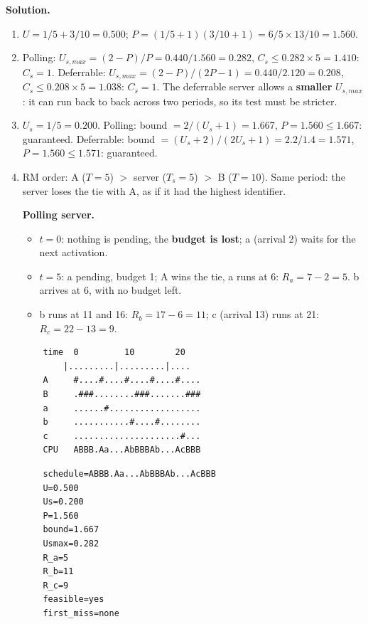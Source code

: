 \textbf{Solution.}
\begin{enumerate}
    \item $U = 1/5 + 3/10 = 0.500$; $P = (1/5 + 1)(3/10 + 1) = 6/5 \times 13/10 = 1.560$.
    \item Polling: $U_{s,max} = (2 - P)/P = 0.440/1.560 = 0.282$, $C_s \le 0.282 \times 5 = 1.410$: $C_s = 1$. Deferrable: $U_{s,max} = (2 - P)/(2P - 1) = 0.440/2.120 = 0.208$, $C_s \le 0.208 \times 5 = 1.038$: $C_s = 1$. The deferrable server allows a \textbf{smaller} $U_{s,max}$: it can run back to back across two periods, so its test must be stricter.
    \item $U_s = 1/5 = 0.200$. Polling: bound $= 2/(U_s + 1) = 1.667$, $P = 1.560 \le 1.667$: guaranteed. Deferrable: bound $= (U_s + 2)/(2U_s + 1) = 2.2/1.4 = 1.571$, $P = 1.560 \le 1.571$: guaranteed.
    \item RM order: A ($T = 5$) $>$ server ($T_s = 5$) $>$ B ($T = 10$). Same period: the server loses the tie with A, as if it had the highest identifier.

    \textbf{Polling server.}
    \begin{itemize}
        \item $t = 0$: nothing is pending, the \textbf{budget is lost}; a (arrival 2) waits for the next activation.
        \item $t = 5$: a pending, budget 1; A wins the tie, a runs at 6: $R_a = 7 - 2 = 5$. b arrives at 6, with no budget left.
        \item b runs at 11 and 16: $R_b = 17 - 6 = 11$; c (arrival 13) runs at 21: $R_c = 22 - 13 = 9$.
    \end{itemize}

\begin{verbatim}
    time  0         10        20
        |.........|.........|....
    A     #....#....#....#....#....
    B     .###........###.......###
    a     ......#..................
    b     ...........#....#........
    c     .....................#...
    CPU   ABBB.Aa...AbBBBAb...AcBBB
\end{verbatim}

\begin{verbatim}
    schedule=ABBB.Aa...AbBBBAb...AcBBB
    U=0.500
    Us=0.200
    P=1.560
    bound=1.667
    Usmax=0.282
    R_a=5
    R_b=11
    R_c=9
    feasible=yes
    first_miss=none
\end{verbatim}


\end{enumerate}
